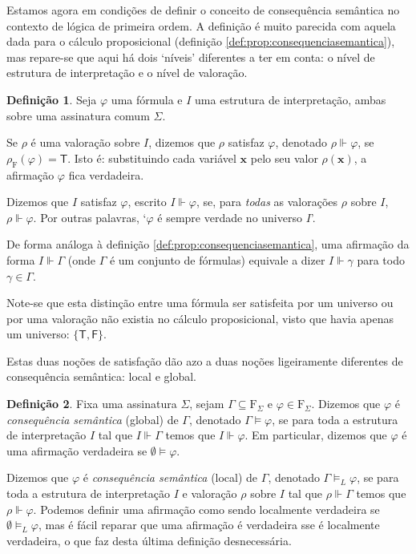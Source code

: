 \documentclass{report}
\theoremstyle{definition}
\newtheorem{definicao}{Definição}
\theoremstyle{remark}
\renewcommand{\bf}[1]{\mathbf{#1}}
\newcommand{\F}{\mathrm{F}}
\newcommand{\lt}{\mathsf{T}}
\newcommand{\lf}{\mathsf{F}}
\begin{document}
	Estamos agora em condições de definir o conceito de consequência semântica no contexto de lógica de primeira ordem. A definição é muito parecida com aquela dada para o cálculo proposicional (definição \ref{def:prop:consequenciasemantica}), mas repare-se que aqui há dois `níveis' diferentes a ter em conta: o nível de estrutura de interpretação e o nível de valoração.
	
	\begin{definicao}
	Seja $\varphi$ uma fórmula e $I$ uma estrutura de interpretação, ambas sobre uma assinatura comum $\Sigma$.
	
	Se $\rho$ é uma valoração sobre $I$, dizemos que $\rho$ satisfaz $\varphi$, denotado $\rho \Vdash \varphi$, se $\rho_\F(\varphi) = \lt$. Isto é: substituindo cada variável $\bf x$ pelo seu valor $\rho(\bf x)$, a afirmação $\varphi$ fica verdadeira.
	
	Dizemos que $I$ satisfaz $\varphi$, escrito $I \Vdash \varphi$, se, para \emph{todas} as valorações $\rho$ sobre $I$, $\rho \Vdash \varphi$. Por outras palavras, `$\varphi$ é sempre verdade no universo $I$'.
	
	De forma análoga à definição \ref{def:prop:consequenciasemantica}, uma afirmação da forma $I \Vdash \Gamma$ (onde $\Gamma$ é um conjunto de fórmulas) equivale a dizer $I \Vdash \gamma$ para todo $\gamma \in \Gamma$.
	\end{definicao}
	
	Note-se que esta distinção entre uma fórmula ser satisfeita por um universo ou por uma valoração não existia no cálculo proposicional, visto que havia apenas um universo: $\{\lt, \lf\}$.
	
	Estas duas noções de satisfação dão azo a duas noções ligeiramente diferentes de consequência semântica: local e global.
	
	\begin{definicao}
	Fixa uma assinatura $\Sigma$, sejam $\Gamma \subseteq \F_\Sigma$ e $\varphi \in \F_\Sigma$. Dizemos que $\varphi$ é \emph{consequência semântica} (global) de $\Gamma$, denotado $\Gamma \vDash \varphi$, se para toda a estrutura de interpretação $I$ tal que $I \Vdash \Gamma$ temos que $I \Vdash \varphi$. Em particular, dizemos que $\varphi$ é uma afirmação verdadeira se $\emptyset \vDash \varphi$.
	
	Dizemos que $\varphi$ é \emph{consequência semântica} (local) de $\Gamma$, denotado $\Gamma \vDash_L \varphi$, se para toda a estrutura de interpretação $I$ e valoração $\rho$ sobre $I$ tal que $\rho \Vdash \Gamma$ temos que $\rho \Vdash \varphi$. Podemos definir uma afirmação como sendo localmente verdadeira se $\emptyset \vDash_L \varphi$, mas é fácil reparar que uma afirmação é verdadeira sse é localmente verdadeira, o que faz desta última definição desnecessária.
	\end{definicao}
	
\end{document}
